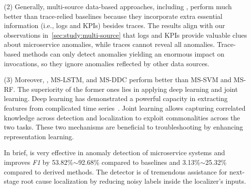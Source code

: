 (2) Generally, multi-source data-based approaches, including \name, perform much better than trace-relied baselines because they incorporate extra essential information (i.e., logs and KPIs) besides traces. 
The results align with our observations in~\cref{sec:study:multi-source} that logs and KPIs provide valuable clues about microservice anomalies, while traces cannot reveal all anomalies.
Trace-based methods can only detect anomalies yielding an enormous impact on invocations, so they ignore anomalies reflected by other data sources.

(3) Moreover, \name, MS-LSTM, and MS-DDC perform better than MS-SVM and MS-RF. 
The superiority of the former ones lies in applying deep learning and joint learning. 
Deep learning has demonstrated a powerful capacity in extracting features from complicated time series~\cite{TCNexp, DeepTSCreview, TSDMreview}. 
Joint learning allows capturing correlated knowledge across detection and localization to exploit commonalities across the two tasks.
These two mechanisms are beneficial to troubleshooting by enhancing representation learning.

In brief, \name is very effective in anomaly detection of microservice systems and improves \textit{F1} by 53.82\%$\sim$92.68\% compared to baselines and 3.13\%$\sim$25.32\% compared to derived methods. 
The detector is of tremendous assistance for next-stage root cause localization by reducing noisy labels inside the localizer's inputs.

